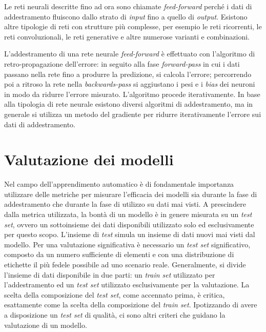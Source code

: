 Le reti neurali descritte fino ad ora sono chiamate \emph{feed-forward} perché i dati di addestramento fluiscono dallo strato di \emph{input} fino a quello di \emph{output}. 
Esistono altre tipologie di reti con strutture più complesse, per esempio le reti ricorrenti, le reti convoluzionali, le reti generative e altre numerose varianti e combinazioni.

L'addestramento di una rete neurale \emph{feed-forward} è effettuato con l'algoritmo di retro-propagazione dell'errore:
in seguito alla fase \emph{forward-pass} in cui i dati passano nella rete fino a produrre la predizione, si calcola l'errore; percorrendo poi a ritroso la rete nella \emph{backwards-pass} si aggiustano i pesi e i \emph{bias} dei neuroni in modo da ridurre l'errore misurato.
L'algoritmo procede iterativamente.
In base alla tipologia di rete neurale esistono diversi algoritmi di addestramento, ma in generale si utilizza un metodo del gradiente per ridurre iterativamente l'errore sui dati di addestramento.

\section{Valutazione dei modelli}\label{sec:valutazione_modelli}
Nel campo dell'apprendimento automatico è di fondamentale importanza utilizzare delle metriche per misurare l'efficacia dei modelli sia durante la fase di addestramento che durante la fase di utilizzo su dati mai visti.
A prescindere dalla metrica utilizzata, la bontà di un modello è in genere misurata su un \emph{test set}, ovvero un sottoinsieme dei dati disponibili utilizzato solo ed esclusivamente per questo scopo.
L'insieme di \emph{test} simula un insieme di dati nuovi mai visti dal modello.
Per una valutazione significativa è necessario un \emph{test set} significativo, composto da un numero sufficiente di elementi e con una distribuzione di etichette il più fedele possibile ad uno scenario reale.
Generalmente, si divide l'insieme di dati disponibile in due parti: un \emph{train set} utilizzato per l'addestramento ed un \emph{test set} utilizzato esclusivamente per la valutazione. 
La scelta della composizione del \emph{test set}, come accennato prima, è critica, esattamente come la scelta della composizione del \emph{train set}.
Ipotizzando di avere a disposizione un \emph{test set} di qualità, ci sono altri criteri che guidano la valutazione di un modello.

